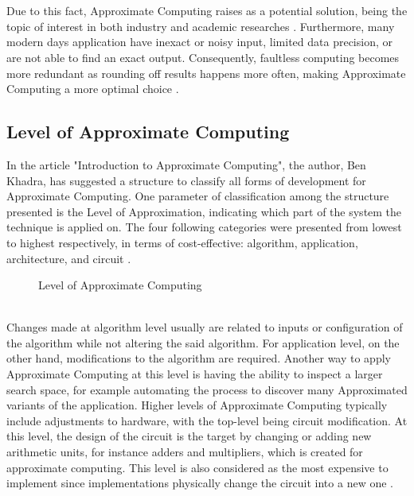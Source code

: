~\\
~\\
Due to this fact, Approximate Computing raises as a potential solution, being the topic of interest in both industry and academic researches \cite{7348659}. Furthermore, many modern days application have inexact or noisy input, limited data precision, or are not able to find an exact output. Consequently, faultless computing becomes more redundant as rounding off results happens more often, making Approximate Computing a more optimal choice \cite{AxCSurvey}. \\

\subsection{Level of Approximate Computing}

In the article "Introduction to Approximate Computing", the author, Ben Khadra, has suggested a structure to classify all forms of development for Approximate Computing. One parameter of classification among the structure presented is the Level of Approximation, indicating which part of the system the technique is applied on. The four following categories were presented from lowest to highest respectively, in terms of cost-effective: algorithm, application, architecture, and circuit \cite{introAxC}. \\
\begin{figure}[H]
\centering
\caption{Level of Approximate Computing}
\end{figure}
~\\
Changes made at algorithm level usually are related to inputs or configuration of the algorithm while not altering the said algorithm. For application level, on the other hand, modifications to the algorithm are required. Another way to apply Approximate Computing at this level is having the ability to inspect a larger search space, for example automating the process to discover many Approximated variants of the application. Higher levels of Approximate Computing typically include adjustments to hardware, with the top-level being circuit modification. At this level, the design of the circuit is the target by changing or adding new arithmetic units, for instance adders and multipliers, which is created for approximate computing. This level is also considered as the most expensive to implement since implementations physically change the circuit into a new one \cite{introAxC}.

